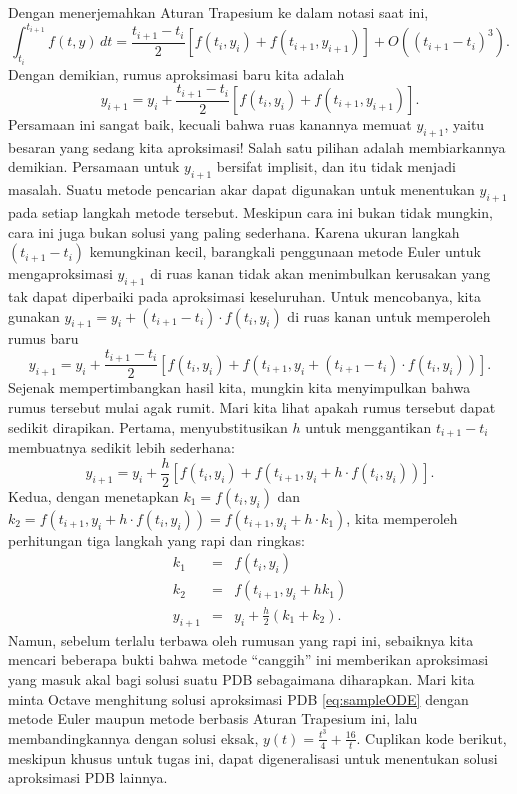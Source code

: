 \noindent Dengan menerjemahkan Aturan Trapesium ke dalam notasi saat
ini,
\[
{\displaystyle \int_{t_{i}}^{t_{i+1}}f(t,y)\,dt=\frac{t_{i+1}-t_{i}}{2}\left[f(t_{i},y_{i})+f(t_{i+1},y_{i+1})\right]+O((t_{i+1}-t_{i})^{3}).}
\]
Dengan demikian, rumus aproksimasi baru kita adalah
\[
y_{i+1}=y_{i}+\frac{t_{i+1}-t_{i}}{2}\left[f(t_{i},y_{i})+f(t_{i+1},y_{i+1})\right].
\]
Persamaan ini sangat baik, kecuali bahwa ruas kanannya memuat $y_{i+1}$,
yaitu besaran yang sedang kita aproksimasi! Salah satu pilihan adalah
membiarkannya demikian. Persamaan untuk $y_{i+1}$ bersifat implisit,
dan itu tidak menjadi masalah. Suatu metode pencarian akar dapat digunakan
untuk menentukan $y_{i+1}$ pada setiap langkah metode tersebut. Meskipun
cara ini bukan tidak mungkin, cara ini juga bukan solusi yang paling
sederhana. Karena ukuran langkah $(t_{i+1}-t_{i})$ kemungkinan kecil,
barangkali penggunaan metode Euler untuk mengaproksimasi $y_{i+1}$
di ruas kanan tidak akan menimbulkan kerusakan yang tak dapat diperbaiki
pada aproksimasi keseluruhan. Untuk mencobanya, kita gunakan $y_{i+1}=y_{i}+(t_{i+1}-t_{i})\cdot f(t_{i},y_{i})$
di ruas kanan untuk memperoleh rumus baru 
\[
y_{i+1}=y_{i}+\frac{t_{i+1}-t_{i}}{2}\left[f(t_{i},y_{i})+f(t_{i+1},y_{i}+(t_{i+1}-t_{i})\cdot f(t_{i},y_{i}))\right].
\]
Sejenak mempertimbangkan hasil kita, mungkin kita menyimpulkan bahwa
rumus tersebut mulai agak rumit. Mari kita lihat apakah rumus tersebut
dapat sedikit dirapikan. Pertama, menyubstitusikan $h$ untuk menggantikan
$t_{i+1}-t_{i}$ membuatnya sedikit lebih sederhana:
\[
y_{i+1}=y_{i}+\frac{h}{2}\left[f(t_{i},y_{i})+f(t_{i+1},y_{i}+h\cdot f(t_{i},y_{i}))\right].
\]
Kedua, dengan menetapkan $k_{1}=f(t_{i},y_{i})$ dan $k_{2}=f(t_{i+1},y_{i}+h\cdot f(t_{i},y_{i}))=f(t_{i+1},y_{i}+h\cdot k_{1})$,
kita memperoleh perhitungan tiga langkah yang rapi dan ringkas:
\begin{eqnarray}
k_{1} & = & f(t_{i},y_{i})\nonumber \\
k_{2} & = & f(t_{i+1},y_{i}+hk_{1})\nonumber \\
y_{i+1} & = & y_{i}+\frac{h}{2}(k_{1}+k_{2}).\label{eq:trapezoidal-ode}
\end{eqnarray}
Namun, sebelum terlalu terbawa oleh rumusan yang rapi ini, sebaiknya
kita mencari beberapa bukti bahwa metode ``canggih'' ini memberikan
aproksimasi yang masuk akal bagi solusi suatu PDB sebagaimana diharapkan.
Mari kita minta Octave menghitung solusi aproksimasi PDB \ref{eq:sampleODE}
dengan metode Euler maupun metode berbasis Aturan Trapesium ini, lalu
membandingkannya dengan solusi eksak, $y(t)=\frac{t^{3}}{4}+\frac{16}{t}$.
Cuplikan kode berikut, meskipun khusus untuk tugas ini, dapat digeneralisasi
untuk menentukan solusi aproksimasi PDB lainnya.

